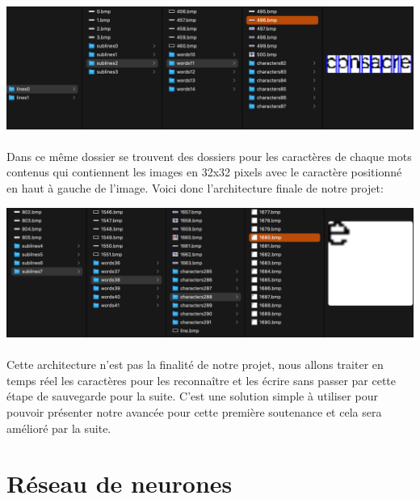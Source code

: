 \documentclass{article}
\begin{document}
	\begin{center}
		\includegraphics[scale=0.4]{cutWords}
	\end{center}
	
	\paragraph{}Dans ce même dossier se trouvent des dossiers pour les caractères de chaque mots contenus qui contiennent les images en 32x32 pixels avec le caractère positionné en haut à gauche de l'image. Voici donc l'architecture finale de notre projet:
	
	\begin{center}
		\includegraphics[scale=0.35]{cutCharacters}
	\end{center}
	
	\paragraph{}Cette architecture n'est pas la finalité de notre projet, nous allons traiter en temps réel les caractères pour les reconnaître et les écrire sans passer par cette étape de sauvegarde pour la suite. C'est une solution simple à utiliser pour pouvoir présenter notre avancée pour cette première soutenance et cela sera amélioré par la suite.
	
\newpage

\section{Réseau de neurones}
\end{document}
